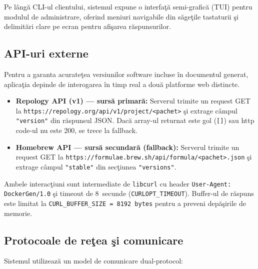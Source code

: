 \documentclass[12pt, a4paper]{article}
\begin{document}
Pe l\^{a}ng\u{a} CLI-ul clientului, sistemul expune o interfa\c{t}\u{a} semi-grafic\u{a} (TUI) pentru
modulul de administrare, oferind meniuri navigabile din s\u{a}ge\c{t}ile tastaturii \c{s}i delimit\u{a}ri
clare pe ecran pentru afi\c{s}area r\u{a}spunsurilor.

\subsection{API-uri externe}

Pentru a garanta acurate\c{t}ea versiunilor software incluse \^{i}n documentul generat, aplica\c{t}ia
depinde de interogarea \^{i}n timp real a dou\u{a} platforme web distincte.

\begin{itemize}
    \item \textbf{Repology API (v1) --- surs\u{a} primar\u{a}:} Serverul trimite un request GET la
    \texttt{https://repology.org/api/v1/project/<pachet>} \c{s}i extrage câmpul \texttt{"version"}
    din r\u{a}spunsul JSON. Dac\u{a} array-ul returnat este gol (\texttt{[]}) sau http code-ul nu
    este 200, se trece la fallback.

    \item \textbf{Homebrew API --- surs\u{a} secundar\u{a} (fallback):} Serverul trimite un request GET
    la \texttt{https://formulae.brew.sh/api/formula/<pachet>.json} \c{s}i extrage câmpul
    \texttt{"stable"} din sec\c{t}iunea \texttt{"versions"}.
\end{itemize}

Ambele interac\c{t}iuni sunt intermediate de \texttt{libcurl} cu header
\texttt{User-Agent: DockerGen/1.0} \c{s}i timeout de 8~secunde (\texttt{CURLOPT\_TIMEOUT}).
Buffer-ul de r\u{a}spuns este limitat la \texttt{CURL\_BUFFER\_SIZE = 8192~bytes} pentru a preveni
dep\u{a}\c{s}irile de memorie.

\subsection{Protocoale de re\c{t}ea \c{s}i comunicare}

Sistemul utilizeaz\u{a} un model de comunicare dual-protocol:
\end{document}
